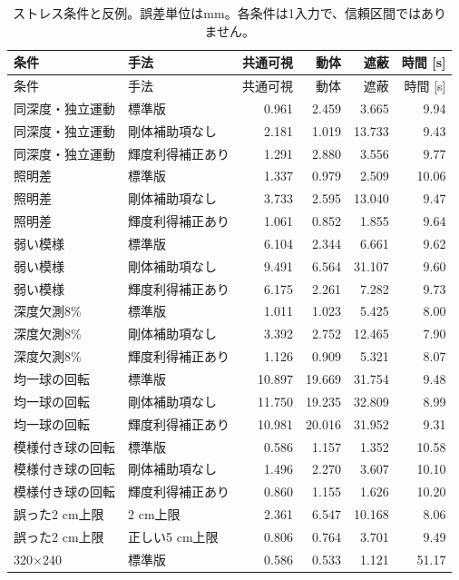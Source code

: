 \begingroup\small
\setlength{\tabcolsep}{4pt}
\begin{longtable}{llrrrr}
\caption{ストレス条件と反例。誤差単位はmm。各条件は1入力で、信頼区間ではありません。}\\
\toprule
条件 & 手法 & 共通可視 & 動体 & 遮蔽 & 時間 [s]\\\midrule\endfirsthead
\toprule
条件 & 手法 & 共通可視 & 動体 & 遮蔽 & 時間 [s]\\\midrule\endhead
\bottomrule\endfoot
同深度・独立運動 & 標準版 & 0.961 & 2.459 & 3.665 & 9.94\\
同深度・独立運動 & 剛体補助項なし & 2.181 & 1.019 & 13.733 & 9.43\\
同深度・独立運動 & 輝度利得補正あり & 1.291 & 2.880 & 3.556 & 9.77\\
照明差 & 標準版 & 1.337 & 0.979 & 2.509 & 10.06\\
照明差 & 剛体補助項なし & 3.733 & 2.595 & 13.040 & 9.47\\
照明差 & 輝度利得補正あり & 1.061 & 0.852 & 1.855 & 9.64\\
弱い模様 & 標準版 & 6.104 & 2.344 & 6.661 & 9.62\\
弱い模様 & 剛体補助項なし & 9.491 & 6.564 & 31.107 & 9.60\\
弱い模様 & 輝度利得補正あり & 6.175 & 2.261 & 7.282 & 9.73\\
深度欠測8\% & 標準版 & 1.011 & 1.023 & 5.425 & 8.00\\
深度欠測8\% & 剛体補助項なし & 3.392 & 2.752 & 12.465 & 7.90\\
深度欠測8\% & 輝度利得補正あり & 1.126 & 0.909 & 5.321 & 8.07\\
均一球の回転 & 標準版 & 10.897 & 19.669 & 31.754 & 9.48\\
均一球の回転 & 剛体補助項なし & 11.750 & 19.235 & 32.809 & 8.99\\
均一球の回転 & 輝度利得補正あり & 10.981 & 20.016 & 31.952 & 9.31\\
模様付き球の回転 & 標準版 & 0.586 & 1.157 & 1.352 & 10.58\\
模様付き球の回転 & 剛体補助項なし & 1.496 & 2.270 & 3.607 & 10.10\\
模様付き球の回転 & 輝度利得補正あり & 0.860 & 1.155 & 1.626 & 10.20\\
誤った2 cm上限 & 2 cm上限 & 2.361 & 6.547 & 10.168 & 8.06\\
誤った2 cm上限 & 正しい5 cm上限 & 0.806 & 0.764 & 3.701 & 9.49\\
320×240 & 標準版 & 0.586 & 0.533 & 1.121 & 51.17\\
\end{longtable}
\endgroup
